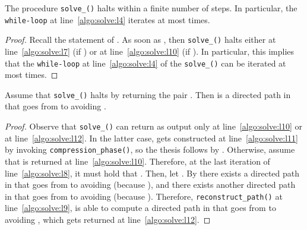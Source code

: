 \begin{proposition}\label{prop:solve_halts_finite}
The procedure \texttt{solve\_\mainproblem()} halts within a finite number of steps.
In particular, the \texttt{while-loop} at line~\ref{algo:solve:l4} iterates at most  times.
\end{proposition}
\begin{proof}
Recall the statement of . As soon as ,
then \texttt{solve\_\mainproblem()} halts either at line~\ref{algo:solve:l7}
(if ) or at line~\ref{algo:solve:l10} (if ).
In particular, this implies that the \texttt{while-loop} at line~\ref{algo:solve:l4} of
the \texttt{solve\_\mainproblem()} can be iterated at most  times.
\end{proof}

\begin{proposition}\label{prop:correctness_yes}
Assume that \texttt{solve\_\mainproblem()} halts by returning the pair .
Then  is a directed path in  that goes from  to  avoiding .
\end{proposition}
\begin{proof}
Observe that \texttt{solve\_\mainproblem()} can return 
as output only at line~\ref{algo:solve:l10} or at line~\ref{algo:solve:l12}.
In the latter case,  gets constructed at line~\ref{algo:solve:l11} by invoking \texttt{compression\_phase()},
so the thesis follows by .
Otherwise, assume that  is returned at line~\ref{algo:solve:l10}.
Therefore, at the last iteration of line~\ref{algo:solve:l8}, it must hold that .
Then, let .
By  there exists a directed path  in  that goes from
 to  avoiding  (because ),
and there exists another directed path  in  that goes from  to  avoiding  (because ).
Therefore, \texttt{reconstruct\_path()} at line~\ref{algo:solve:l9},
is able to compute a directed path  in  that goes from  to 
avoiding , which gets returned at line~\ref{algo:solve:l12}.
\end{proof}

